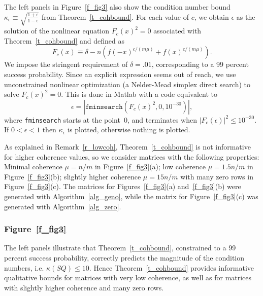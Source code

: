 \documentclass{siamltex}
\begin{document}
The left panels in Figure~\ref{f_fig3} also show
the condition number bound 
$\kappa_{\epsilon}\equiv \sqrt{\tfrac{1+\epsilon}{1-\epsilon}}$
from Theorem~\ref{t_cohbound}. For each value of $c$, 
we obtain $\epsilon$ as
the solution of the nonlinear equation $F_c(x)^2=0$ associated with
Theorem~\ref{t_cohbound} and defined as 
$$F_c(x)\equiv \delta -
n\left(f(-x)^{c/(m\mu)}+ f(x)^{c/(m\mu)}\right).$$
We impose the stringent requirement
of $\delta = .01$, corresponding to a 99 percent success probability.
Since an explicit expression seems out of reach, we use unconstrained 
nonlinear optimization (a Nelder-Mead simplex direct search) to solve
$F_c(x)^2=0$. This is done in Matlab with a code equivalent to 
$$\epsilon=\left|\texttt{fminsearch}(F_c(x)^2,0, 10^{-30})\right|,$$
where \texttt{fminsearch} starts at the point~0, and  
terminates when $|F_c(\epsilon)|^2\leq 10^{-30}$.
If $0<\epsilon<1$  then 
$\kappa_{\epsilon}$ is plotted, otherwise nothing is plotted.

As explained in Remark~\ref{r_lowcoh}, 
Theorem~\ref{t_cohbound} is not informative for higher coherence 
values, so we consider matrices with the following properties:
Minimal coherence $\mu=n/m$ in
Figure~\ref{f_fig3}(a); low coherence $\mu=1.5n/m$ in
Figure~\ref{f_fig3}(b);  slightly higher coherence $\mu=15n/m$ 
with many zero rows in Figure~\ref{f_fig3}(c). 
The matrices for Figures~\ref{f_fig3}(a) 
and~\ref{f_fig3}(b) were generated with Algorithm~\ref{alg_geno}, 
while the matrix for Figure~\ref{f_fig3}(c) was generated 
with Algorithm~\ref{alg_zero}.

\subsubsection*{Figure~\ref{f_fig3}}
The left panels illustrate that Theorem~\ref{t_cohbound},
constrained to a 99 percent success probability, correctly
predicts the magnitude of the condition numbers, i.e.  $\kappa(SQ)\leq
10$.  Hence Theorem~\ref{t_cohbound} provides informative qualitative
bounds for matrices with very low coherence, as well as for matrices
with slightly higher coherence and many zero rows.
\end{document}
